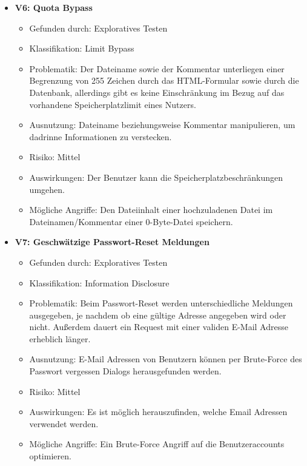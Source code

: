 \documentclass[12pt,DIV14,BCOR10mm,a4paper,parskip=half-,headsepline,headinclude,english,ngerman,bibliography=totocnumbered]{scrreprt}
\begin{document}
\begin{itemize}
  \hypertarget{vulnerability6}{}
  \item \textbf{V6: Quota Bypass}
  \begin{itemize}
    \item Gefunden durch: Exploratives Testen
    \item Klassifikation: Limit Bypass
    \item Problematik: Der Dateiname sowie der Kommentar unterliegen einer Begrenzung von 255 Zeichen durch das HTML-Formular sowie durch die Datenbank, allerdings gibt es keine Einschränkung im Bezug auf das vorhandene Speicherplatzlimit eines Nutzers.
    \item Ausnutzung: Dateiname beziehungsweise Kommentar manipulieren, um dadrinne Informationen zu verstecken.
    \item Risiko: Mittel
    \item Auswirkungen: Der Benutzer kann die Speicherplatzbeschränkungen umgehen.
    \item Mögliche Angriffe: Den Dateiinhalt einer hochzuladenen Datei im Dateinamen/Kommentar einer 0-Byte-Datei speichern.
  \end{itemize}

  \hypertarget{vulnerability7}{}
  \item \textbf{V7: Geschwätzige Passwort-Reset Meldungen}
  \begin{itemize}
  \item Gefunden durch: Exploratives Testen
  \item Klassifikation: Information Disclosure
  \item Problematik: Beim Passwort-Reset werden unterschiedliche Meldungen ausgegeben, je nachdem ob eine gültige Adresse angegeben wird oder nicht. Außerdem dauert ein Request mit einer validen E-Mail Adresse erheblich länger.
  \item Ausnutzung: E-Mail Adressen von Benutzern können per Brute-Force des Passwort vergessen Dialogs herausgefunden werden.
  \item Risiko: Mittel
  \item Auswirkungen: Es ist möglich herauszufinden, welche Email Adressen verwendet werden.
  \item Mögliche Angriffe: Ein Brute-Force Angriff auf die Benutzeraccounts optimieren.
  \end{itemize}


\end{itemize}
\end{document}
